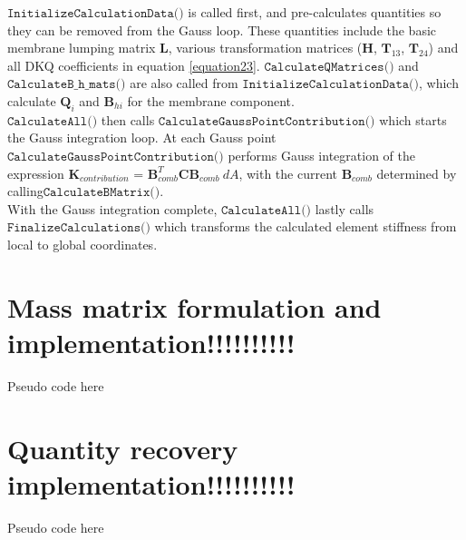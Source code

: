 $\texttt{InitializeCalculationData()}$ is called first, and pre-calculates quantities so they can be removed from the Gauss loop. These quantities include the basic membrane lumping matrix $\textbf{L}$, various transformation matrices ($\textbf{H}$, $\textbf{T}_{13}$, $\textbf{T}_{24}$) and all DKQ coefficients in equation  \eqref{equation23}. $\texttt{CalculateQMatrices()}$ and $\texttt{CalculateB$\_$h$\_$mats()}$ are also called from $\texttt{InitializeCalculationData()}$, which calculate $\textbf{Q}_i$ and $\textbf{B}_{hi}$ for the membrane component.\\

$\texttt{CalculateAll()}$ then calls $\texttt{CalculateGaussPointContribution()}$ which starts the Gauss integration loop. At each Gauss point $\texttt{CalculateGaussPointContribution()}$ performs Gauss integration of the expression $\textbf{K}_{contribution}$ = $\textbf{B}_{comb}^T \textbf{C} \textbf{B}_{comb}\  dA$, with the current $\textbf{B}_{comb}$ determined by calling\break$\texttt{CalculateBMatrix()}$. \\

With the Gauss integration complete, $\texttt{CalculateAll()}$ lastly calls $\texttt{FinalizeCalculations()}$ which transforms the calculated element stiffness from local to global coordinates.

\section{Mass matrix formulation and implementation!!!!!!!!!!}

Pseudo code here

\section{Quantity recovery implementation!!!!!!!!!!}

Pseudo code here